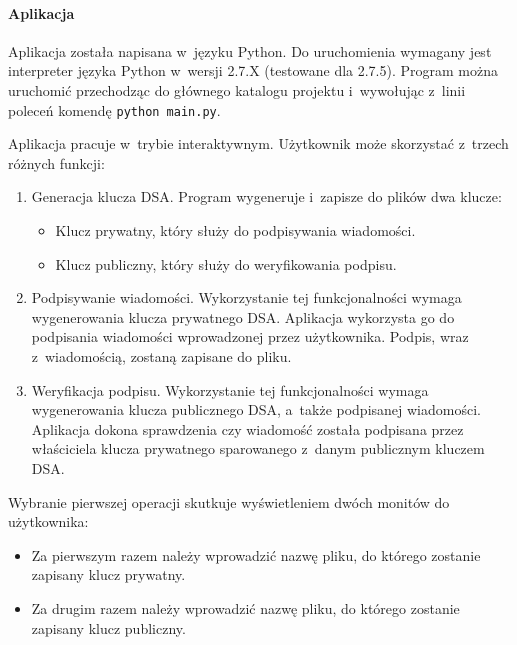 \documentclass{article}
\begin{document}
        \paragraph{Aplikacja} Aplikacja została napisana w~języku Python. Do uruchomienia wymagany jest interpreter języka Python w~wersji 2.7.X (testowane dla 2.7.5). Program można uruchomić przechodząc do głównego katalogu projektu i~wywołując z~linii poleceń komendę \verb+python main.py+.
        
            Aplikacja pracuje w~trybie interaktywnym. Użytkownik może skorzystać z~trzech różnych funkcji:
            
            \begin{enumerate}
                \item Generacja klucza DSA. Program wygeneruje i~zapisze do plików dwa klucze:
                \begin{itemize}
                    \item Klucz prywatny, który służy do podpisywania wiadomości.
                    \item Klucz publiczny, który służy do weryfikowania podpisu.
                \end{itemize}
                
                \item Podpisywanie wiadomości. Wykorzystanie tej funkcjonalności wymaga wygenerowania klucza prywatnego DSA. Aplikacja wykorzysta go do podpisania wiadomości wprowadzonej przez użytkownika. Podpis, wraz z~wiadomością, zostaną zapisane do pliku.
                
                \item Weryfikacja podpisu. Wykorzystanie tej funkcjonalności wymaga wygenerowania klucza publicznego DSA, a~także podpisanej wiadomości. Aplikacja dokona sprawdzenia czy wiadomość została podpisana przez właściciela klucza prywatnego sparowanego z~danym publicznym kluczem DSA.

            \end{enumerate}

            Wybranie pierwszej operacji skutkuje wyświetleniem dwóch monitów do użytkownika:
            
            \begin{itemize}
                \item Za pierwszym razem należy wprowadzić nazwę pliku, do którego zostanie zapisany klucz prywatny.
                \item Za drugim razem należy wprowadzić nazwę pliku, do którego zostanie zapisany klucz publiczny.
            \end{itemize}
\end{document}
